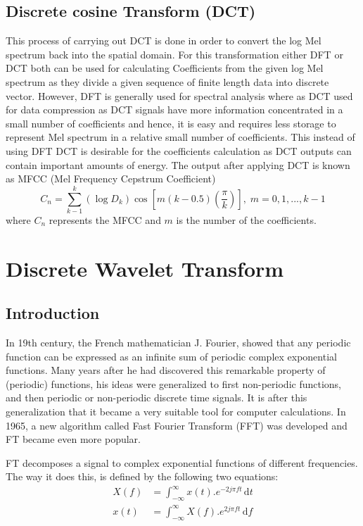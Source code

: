 \documentclass[12pt, a4paper, twoside]{report}
\begin{document}
\subsection{Discrete cosine Transform (DCT)}
This process of carrying  out  DCT  is  done  in  order  to  convert  the  log  Mel  spectrum  back  into  the spatial  domain.  For this transformation either  DFT  or  DCT  both  can  be  used  for  calculating Coefficients from the given log Mel spectrum as they divide a given sequence of finite length data into discrete  vector.  However,  DFT  is  generally  used  for  spectral  analysis  where  as  DCT  used  for  data compression  as  DCT  signals  have  more  information  concentrated  in  a  small  number  of  coefficients and hence, it is easy and requires less storage to represent Mel spectrum in a relative small number of coefficients.  This instead of  using  DFT  DCT  is  desirable  for  the coefficients calculation  as  DCT outputs can contain important amounts of energy. The output after applying DCT is known as MFCC (Mel Frequency Cepstrum Coefficient)
\begin{equation}
C_n = \sum_{k-1}^{k}\left ( \log D_k \right )\cos \left [ m(k-0.5) \left ( \frac{\pi}{k} \right ) \right ], \; m=0,1,...,k-1
\end{equation}
where $C_n$ represents the MFCC and $m$ is the number of the coefficients.
 
\section{Discrete Wavelet Transform}
\subsection{Introduction}
In 19th century, the French mathematician J. Fourier, showed that any periodic function can be expressed as an infinite sum of periodic complex exponential functions. Many years after he had discovered this remarkable property of (periodic) functions, his ideas were generalized to first non-periodic functions, and then periodic or non-periodic discrete time signals. It is after this generalization that it became a very suitable tool for computer calculations. In 1965, a new algorithm called Fast Fourier Transform (FFT) was developed and FT became even more popular.
\par
FT decomposes a signal to complex exponential functions of different frequencies. The way it does this, is defined by the following two equations:
\begin{align}
X(f) &= \int_{-\infty}^{\infty} x(t) . e^{-2j\pi ft} \, \text{d}t \label{eq:fourier-transform} \\
x(t) &= \int_{-\infty}^{\infty} X(f) . e^{2j\pi ft} \, \text{d}f 
\end{align}
\end{document}
